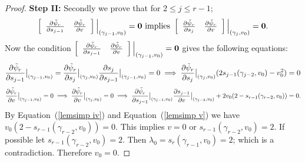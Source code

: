 \documentclass[10pt,a4paper]{amsart}
\begin{document}
\begin{proof}
    
\textbf{Step II:} Secondly we prove that for $2\leq j\leq r-1$; 
\begin{eqnarray*}
\left[\begin{array}{ccc}
\frac{\partial\Tilde{\psi}_r}{\partial s_{j-1}} & \frac{\partial\Tilde{\psi}_r}{\partial v}  \end{array}\right]\Big |_{(\gamma_{j-1},v_0)}=\mathbf{0}\  \text{implies}\  \left[\begin{array}{ccc}
    \frac{\partial\Tilde{\psi}_r}{\partial s_j} & \frac{\partial\Tilde{\psi}_r}{\partial v}  \end{array}\right]\Big |_{(\gamma_j,v_0)}=\mathbf{0}.
     \end{eqnarray*}
Now the condition $\left[\begin{array}{ccc}
    \frac{\partial\Tilde{\psi}_r}{\partial s_{j-1}} & \frac{\partial\Tilde{\psi}_r}{\partial v}  \end{array}\right]\Big |_{(\gamma_{j-1},v_0)}=\mathbf{0}$
    gives the following equations:
    \begin{equation}{\label{lemsimp iv}}
    \frac{\partial\Tilde{\psi}_r}{\partial s_{j-1}}\big |_{(\gamma_{j-1},v_0)}=\frac{\partial\Tilde{\psi}_r}{\partial s_{j}}\big |_{(\gamma_j,v_0)}\frac{\partial s_{j}}{\partial s_{j-1}}\big |_{(\gamma_{j-1},v_0)}=0\implies \frac{\partial\Tilde{\psi}_r}{\partial s_{j}}\big |_{(\gamma_j,v_0)}(2s_{j-1}(\gamma_{j-2},v_0)-v_0^2)=0
  \end{equation}
\begin{equation}{\label{lemsimp v}}
\frac{\partial\Tilde{\psi}_r}{\partial v}\big |_{(\gamma_{j-1},v_0)} =0\implies \frac{\partial\Tilde{\psi}_r}{\partial v}\big |_{(\gamma_{j},v_0)}=0\implies\frac{\partial\Tilde{\psi}_r}{\partial s_{j-1}}\big|_{(\gamma_{j-1},v_0)}\frac{\partial s_{j-1}}{\partial v}\big|_{(\gamma_{j-2},v_0)}+ 2v_0(2-s_{r-1}(\gamma_{r-2},v_0))=0.
\end{equation}
By Equation~(\ref{lemsimp iv}) and Equation~(\ref{lemsimp v}) we have $v_0(2-s_{r-1}(\gamma_{r-2},v_0))=0$. This implies $v=0$ or $s_{r-1}(\gamma_{r-2},v_0)=2$. If possible let  $s_{r-1}(\gamma_{r-2},v_0)=2$. Then $\lambda_0=s_r(\gamma_{r-1},v_0)=2$; which is a contradiction. Therefore $v_0=0$. 
 

\end{proof}
\end{document}
